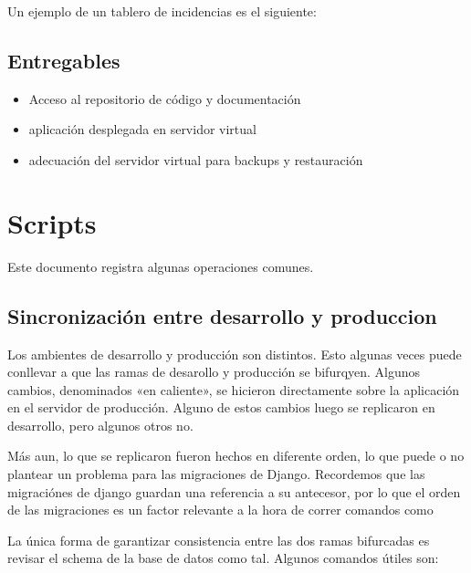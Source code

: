 \documentclass[letterpaper,10pt,spanish]{sphinxmanual}
\begin{document}
Un ejemplo de un tablero de incidencias es el siguiente:



\section{Entregables}
\label{\detokenize{requerimientos/resumen_validacion:entregables}}\begin{itemize}
\item {} 
Acceso al repositorio de código y documentación

\item {} 
aplicación desplegada en servidor virtual

\item {} 
adecuación del servidor virtual para backups y restauración

\end{itemize}


\chapter{Scripts}
\label{\detokenize{operaciones/scripts:scripts}}\label{\detokenize{operaciones/scripts::doc}}
Este documento registra algunas operaciones comunes.


\section{Sincronización entre desarrollo y produccion}
\label{\detokenize{operaciones/scripts:sincronizacion-entre-desarrollo-y-produccion}}
Los ambientes de desarrollo y producción son distintos.
Esto algunas veces puede conllevar a que las ramas
de desarollo y producción se bifurqyen. Algunos
cambios, denominados «en caliente», se hicieron
directamente sobre la aplicación en el servidor de producción.
Alguno de estos cambios luego se replicaron en desarrollo, pero algunos
otros no.

Más aun, lo que se replicaron fueron hechos en diferente
orden, lo que puede o no plantear un problema para las migraciones de
Django. Recordemos que las migraciónes de django guardan
una referencia a su antecesor, por lo que el orden de las migraciones
es un factor relevante a la hora de correr comandos como 

La única forma de garantizar consistencia entre las dos ramas bifurcadas
es revisar el schema de la base de datos como tal. Algunos comandos útiles
son:
\end{document}
